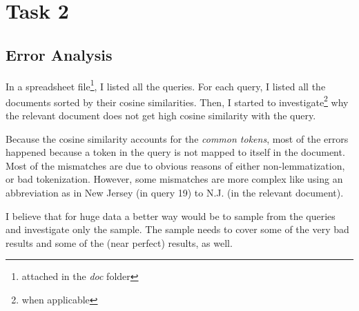 \documentclass{article}
\begin{document}
\section{Task 2}

\subsection{Error Analysis}

In a spreadsheet file\footnote{attached in the \textit{doc} folder}, I listed all the queries. For each query, I listed all the documents sorted by their cosine similarities. Then, I started to investigate\footnote{when applicable} why the relevant document does not get high cosine similarity with the query.

Because the cosine similarity accounts for the \textit{common tokens}, most of the errors happened because a token in the query is not mapped to itself in the document. Most of the mismatches are due to obvious reasons of either non-lemmatization, or bad tokenization. However, some mismatches are more complex like using an abbreviation as in New Jersey (in query 19) to N.J. (in the relevant document).

I believe that for huge data a better way would be to sample from the queries and investigate only the sample. The sample needs to cover some of the very bad results and some of the (near perfect) results, as well.
\end{document}
